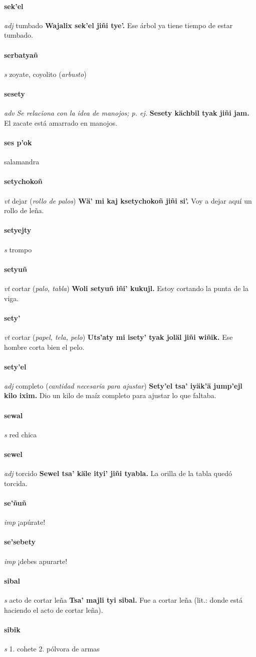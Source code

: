 \documentclass{scrbook}
\newcommand{\entry}[1]{\paragraph{#1}}
\newcommand{\onedefinition}[1]{#1.}
\newcommand{\nontranslationdef}[1]{\textit{#1}}
\newcommand{\partofspeech}[1]{\textit{#1}}
\newcommand{\spanishtranslation}[1]{#1}
\newcommand{\clarification}[1]{(\textit{#1})}
\newcommand{\cholexample}[1]{\textbf{#1}}
\newcommand{\exampletranslation}[1]{#1}
\begin{document}
\begin{multicols}{2}
\entry{sek'el}
\partofspeech{adj}
\spanishtranslation{tumbado}
\cholexample{Wajalix sek'el jiñi tye'.}
\exampletranslation{Ese árbol ya tiene tiempo de estar tumbado.}

\entry{serbatyañ}
\partofspeech{s}
\spanishtranslation{zoyate, coyolito}
\clarification{arbusto}

\entry{sesety}
\partofspeech{adv}
\nontranslationdef{Se relaciona con la idea de manojos; p. ej.}
\cholexample{Sesety kächbil tyak jiñi jam.}
\exampletranslation{El zacate está amarrado en manojos.}

\entry{ses p'ok}
\spanishtranslation{salamandra}

\entry{setychokoñ}
\partofspeech{vt}
\spanishtranslation{dejar}
\clarification{rollo de palos}
\cholexample{Wä' mi kaj ksetychokoñ jiñi si'.}
\exampletranslation{Voy a dejar aquí un rollo de leña.}

\entry{setyejty}
\partofspeech{s}
\spanishtranslation{trompo}

\entry{setyuñ}
\partofspeech{vt}
\spanishtranslation{cortar}
\clarification{palo, tabla}
\cholexample{Woli setyuñ iñi' kukujl.}
\exampletranslation{Estoy cortando la punta de la viga.}

\entry{sety'}
\partofspeech{vt}
\spanishtranslation{cortar}
\clarification{papel, tela, pelo}
\cholexample{Uts'aty mi isety' tyak joläl jiñi wiñik.}
\exampletranslation{Ese hombre corta bien el pelo.}

\entry{sety'el}
\partofspeech{adj}
\spanishtranslation{completo}
\clarification{cantidad necesaria para ajustar}
\cholexample{Sety'el tsa' iyäk'ä jump'ejl kilo ixim.}
\exampletranslation{Dio un kilo de maíz completo para ajustar lo que faltaba.}

\entry{sewal}
\partofspeech{s}
\spanishtranslation{red chica}

\entry{sewel}
\partofspeech{adj}
\spanishtranslation{torcido}
\cholexample{Sewel tsa' käle ityi' jiñi tyabla.}
\exampletranslation{La orilla de la tabla quedó torcida.}

\entry{se'ñuñ}
\partofspeech{imp}
\spanishtranslation{¡apúrate!}

\entry{se'sebety}
\partofspeech{imp}
\spanishtranslation{¡debes apurarte!}

\entry{sibal}
\partofspeech{s}
\spanishtranslation{acto de cortar leña}
\cholexample{Tsa' majli tyi sibal.}
\exampletranslation{Fue a cortar leña (lit.: donde está haciendo el acto de cortar leña).}

\entry{sibik}
\partofspeech{s}
\onedefinition{1}
\spanishtranslation{cohete}
\onedefinition{2}
\spanishtranslation{pólvora de armas}


\end{multicols}
\end{document}
